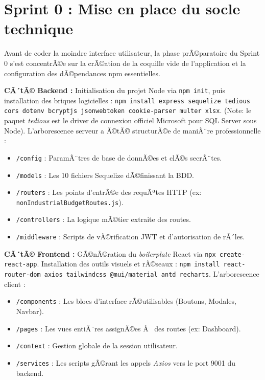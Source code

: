 \section{Sprint 0 : Mise en place du socle technique}
Avant de coder la moindre interface utilisateur, la phase prÃ©paratoire du Sprint 0 s'est concentrÃ©e sur la crÃ©ation de la coquille vide de l'application et la configuration des dÃ©pendances npm essentielles.

\textbf{CÃ´tÃ© Backend :}
Initialisation du projet Node via \texttt{npm init}, puis installation des briques logicielles :
\texttt{npm install express sequelize tedious cors dotenv bcryptjs jsonwebtoken cookie-parser multer xlsx}. 
(Note: le paquet \textit{tedious} est le driver de connexion officiel Microsoft pour SQL Server sous Node).
L'arborescence serveur a Ã©tÃ© structurÃ©e de maniÃ¨re professionnelle :
\begin{itemize}
    \item \texttt{/config} : ParamÃ¨tres de base de donnÃ©es et clÃ©s secrÃ¨tes.
    \item \texttt{/models} : Les 10 fichiers Sequelize dÃ©finissant la BDD.
    \item \texttt{/routers} : Les points d'entrÃ©e des requÃªtes HTTP (ex: \texttt{nonIndustrialBudgetRoutes.js}).
    \item \texttt{/controllers} : La logique mÃ©tier extraite des routes.
    \item \texttt{/middleware} : Scripts de vÃ©rification JWT et d'autorisation de rÃ´les.
\end{itemize}

\textbf{CÃ´tÃ© Frontend :}
GÃ©nÃ©ration du \textit{boilerplate} React via \texttt{npx create-react-app}. Installation des outils visuels et rÃ©seaux :
\texttt{npm install react-router-dom axios tailwindcss @mui/material antd recharts}.
L'arborescence client :
\begin{itemize}
    \item \texttt{/components} : Les blocs d'interface rÃ©utilisables (Boutons, Modales, Navbar).
    \item \texttt{/pages} : Les vues entiÃ¨res assignÃ©es Ã  des routes (ex: Dashboard).
    \item \texttt{/context} : Gestion globale de la session utilisateur.
    \item \texttt{/services} : Les scripts gÃ©rant les appels \textit{Axios} vers le port 9001 du backend.
\end{itemize}

